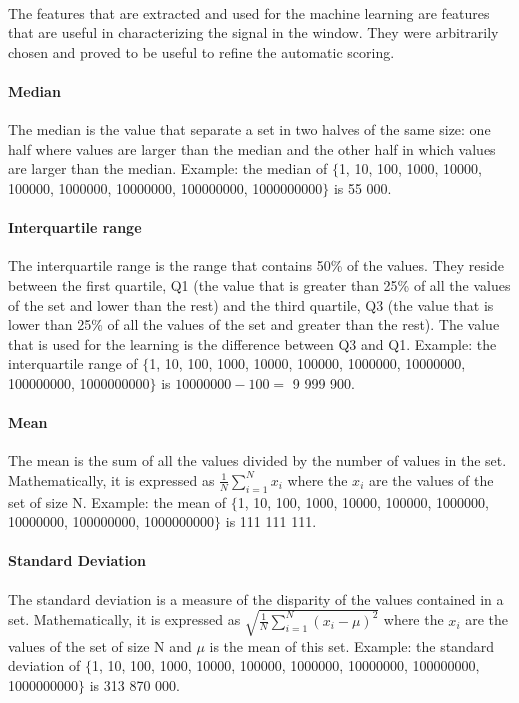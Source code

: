 \documentclass[a4paper,12pt]{article}
\begin{document}
\paragraph{}
The features that are extracted and used for the machine learning are features that are useful in characterizing the signal in the window. They were arbitrarily chosen and proved to be useful to refine the automatic scoring.

\paragraph{Median} The median is the value that separate a set in two halves of the same size: one half where values are larger than the median and the other half in which values are larger than the median. Example: the median of $\{$1, 10, 100, 1000, 10000, 100000, 1000000, 10000000, 100000000, 1000000000$\}$ is 55 000.

\paragraph{Interquartile range} The interquartile range is the range that contains 50\% of the values. They reside between the first quartile, Q1 (the value that is greater than 25\% of all the values of the set and lower than the rest) and the third quartile, Q3 (the value that is lower than 25\% of all the values of the set and greater than the rest). The value that is used for the learning is the difference between Q3 and Q1. Example: the interquartile range of $\{$1, 10, 100, 1000, 10000, 100000, 1000000, 10000000, 100000000, 1000000000$\}$ is $10000000 - 100 =$ 9 999 900.

\paragraph{Mean} The mean is the sum of all the values divided by the number of values in the set. Mathematically, it is expressed as $\frac{1}{N}\sum_{i = 1}^N x_i$ where the $x_i$ are the values of the set of size N. Example: the mean of $\{$1, 10, 100, 1000, 10000, 100000, 1000000, 10000000, 100000000, 1000000000$\}$ is 111 111 111.

\paragraph{Standard Deviation} The standard deviation is a measure of the disparity of the values contained in a set. Mathematically, it is expressed as $\sqrt{\frac{1}{N}\sum_{i = 1}^N (x_i - \mu)^2}$ where the $x_i$ are the values of the set of size N and $\mu$ is the mean of this set. Example: the standard deviation of $\{$1, 10, 100, 1000, 10000, 100000, 1000000, 10000000, 100000000, 1000000000$\}$ is 313 870 000.
\end{document}
